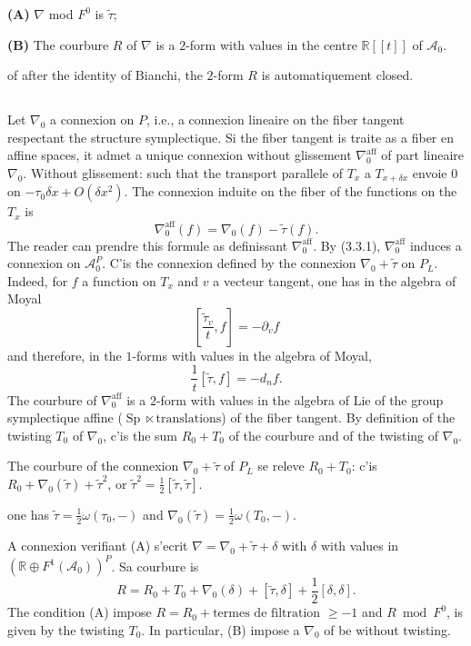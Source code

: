 \documentclass[11pt,a4paper]{article}
\theoremstyle{plain}
\theoremstyle{definition}
\DeclareMathOperator{\Sp}{Sp}
\newcommand{\R}{\mathbb{R}}
\begin{document}
\medskip
\noindent \textbf{(A)} $\nabla$ mod $F^{0}$ is $\tilde{\tau}$;

\noindent \textbf{(B)} The courbure $R$ of $\nabla$ is a $2$-form with values in the centre $\R[[t]]$ of $\mathcal{A}_{0}$.

\medskip
of after the identity of Bianchi, the $2$-form $R$ is automatiquement closed.

\subsection{}
Let $\nabla_{0}$ a connexion on $P$, i.e., a connexion lineaire on the fiber tangent respectant the structure symplectique. Si the fiber tangent is traite as a fiber en affine spaces, it admet a unique connexion without glissement $\nabla_{0}^{\text{aff}}$ of part lineaire $\nabla_{0}$. Without glissement: such that the transport parallele of $T_{x}$ a $T_{x+\delta x}$ envoie $0$
on $-\tau_{0} \delta x + O(\delta x^{2})$. The connexion induite on the fiber of the functions on the $T_{x}$ is
\[
\nabla_{0}^{\text{aff}}(f) = \nabla_{0}(f) - \tilde{\tau}(f).
\]
The reader can prendre this formule as definissant $\nabla_{0}^{\text{aff}}$. By (3.3.1), $\nabla_{0}^{\text{aff}}$
induces a connexion on $\mathcal{A}_{0}^{P}$. C'is the connexion defined by the connexion $\nabla_{0} + \tilde{\tau}$
on $P_{L}$. Indeed, for $f$ a function on $T_{x}$ and $v$ a vecteur tangent, one has in
the algebra of Moyal
\[
\left[\frac{\tilde{\tau}_{v}}{t}, f\right] = -\partial_{v} f
\]
and therefore, in the $1$-forms with values in the algebra of Moyal,
\[
\frac{1}{t}[\tilde{\tau}, f] = -d_{n}f.
\]
The courbure of $\nabla_{0}^{\text{aff}}$ is a $2$-form with values in the algebra of Lie of the group symplectique affine ($\Sp \ltimes \text{translations}$) of the fiber tangent. By definition of the twisting
$T_{0}$ of $\nabla_{0}$, c'is the sum $R_{0} + T_{0}$ of the courbure and of the twisting of $\nabla_{0}$.

The courbure of the connexion $\nabla_{0} + \tilde{\tau}$ of $P_{L}$ se releve $R_{0} + T_{0}$: c'is $R_{0} + \nabla_{0}(\tilde{\tau}) + \tilde{\tau}^{2}$, or $\tilde{\tau}^{2} = \frac{1}{2}[\tilde{\tau}, \tilde{\tau}]$.

one has $\tilde{\tau} = \frac{1}{2} \omega(\tau_{0}, -)$ and $\nabla_{0}(\tilde{\tau}) = \frac{1}{2} \omega(T_{0}, -)$.

A connexion verifiant (A) s'ecrit $\nabla = \nabla_{0} + \tilde{\tau} + \delta$
with $\delta$ with values in $(\R \oplus F^{1}(\mathcal{A}_{0}))^{P}$. Sa courbure is
\[
R = R_{0} + T_{0} + \nabla_{0}(\delta) + [\tilde{\tau}, \delta] + \frac{1}{2}[\delta, \delta].
\]
The condition (A) impose $R = R_{0} + \text{termes de filtration } \geq -1$
and $R \bmod F^{0}$, is given by the twisting $T_{0}$. In particular, (B) impose a $\nabla_{0}$ of be without twisting.
\end{document}
